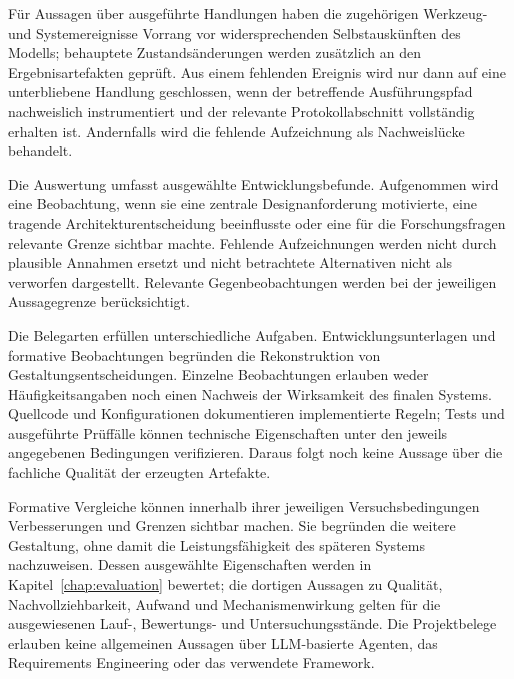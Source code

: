 Für Aussagen über ausgeführte Handlungen haben die zugehörigen
Werkzeug- und Systemereignisse Vorrang vor widersprechenden
Selbstauskünften des Modells; behauptete Zustandsänderungen werden
zusätzlich an den Ergebnisartefakten geprüft. Aus einem fehlenden
Ereignis wird nur dann auf eine unterbliebene Handlung geschlossen,
wenn der betreffende Ausführungspfad nachweislich instrumentiert
und der relevante Protokollabschnitt vollständig erhalten ist.
Andernfalls wird die fehlende Aufzeichnung als Nachweislücke behandelt.

Die Auswertung umfasst ausgewählte Entwicklungsbefunde. Aufgenommen
wird eine Beobachtung, wenn sie eine zentrale Designanforderung
motivierte, eine tragende Architekturentscheidung beeinflusste oder
eine für die Forschungsfragen relevante Grenze sichtbar machte.
Fehlende Aufzeichnungen werden nicht durch plausible Annahmen ersetzt
und nicht betrachtete Alternativen nicht als verworfen dargestellt.
Relevante Gegenbeobachtungen werden bei der jeweiligen Aussagegrenze
berücksichtigt.

Die Belegarten erfüllen unterschiedliche Aufgaben. Entwicklungsunterlagen
und formative Beobachtungen begründen die Rekonstruktion von
Gestaltungsentscheidungen. Einzelne Beobachtungen erlauben weder
Häufigkeitsangaben noch einen Nachweis der Wirksamkeit des finalen
Systems. Quellcode und Konfigurationen dokumentieren implementierte
Regeln; Tests und ausgeführte Prüffälle können technische Eigenschaften
unter den jeweils angegebenen Bedingungen verifizieren. Daraus folgt
noch keine Aussage über die fachliche Qualität der erzeugten Artefakte.

Formative Vergleiche können innerhalb ihrer jeweiligen
Versuchsbedingungen Verbesserungen und Grenzen sichtbar machen. Sie
begründen die weitere Gestaltung, ohne damit die Leistungsfähigkeit des
späteren Systems nachzuweisen. Dessen ausgewählte Eigenschaften werden
in Kapitel~\ref{chap:evaluation} bewertet; die dortigen Aussagen zu
Qualität, Nachvollziehbarkeit, Aufwand und Mechanismenwirkung gelten
für die ausgewiesenen Lauf-, Bewertungs- und Untersuchungsstände.
Die Projektbelege erlauben keine allgemeinen Aussagen über LLM-basierte
Agenten, das Requirements Engineering oder das verwendete Framework.
